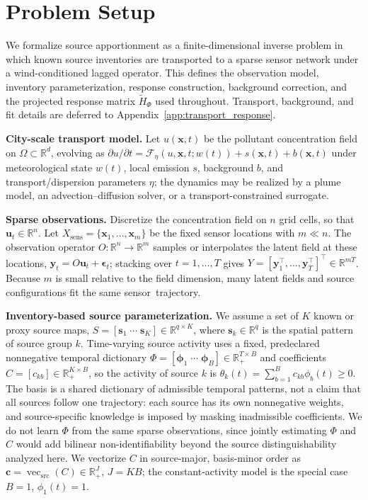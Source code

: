 \section{Problem Setup}
\label{sec:problem_setup}

We formalize source apportionment as a finite-dimensional inverse problem in which
known source inventories are transported to a sparse sensor network under a
wind-conditioned lagged operator.  This defines the observation model, inventory
parameterization, response construction, background correction, and the projected
response matrix \(\widetilde H_\Phi\) used throughout.  Transport, background, and fit
details are deferred to Appendix~\ref{app:transport_response}.

\noindent\textbf{City-scale transport model.}
Let \(u(\mathbf x,t)\) be the pollutant concentration field on
\(\Omega\subset \mathbb R^d\), evolving as \(\partial u/\partial t
= \mathcal F_\eta(u,\mathbf x,t;w(t)) + s(\mathbf x,t)+b(\mathbf x,t)\) under
meteorological state \(w(t)\), local emission \(s\), background \(b\), and
transport/dispersion parameters \(\eta\); the dynamics may be realized by a plume
model, an advection--diffusion solver, or a transport-constrained surrogate.

\noindent\textbf{Sparse observations.}
Discretize the concentration field on \(n\) grid cells, so that
\(\mathbf u_t\in \mathbb R^n\).  Let
\(X_{\mathrm{sens}}=\{\mathbf x_1,\ldots,\mathbf x_m\}\) be the fixed sensor
locations with \(m\ll n\).  The observation operator
\(O:\mathbb R^n\to \mathbb R^m\) samples or interpolates the latent field at
these locations, \(\mathbf y_t = O\mathbf u_t + \boldsymbol\epsilon_t\); stacking
over \(t=1,\ldots,T\) gives
\(Y = [\mathbf y_1^\top,\ldots,\mathbf y_T^\top]^\top \in \mathbb R^{mT}\).
Because \(m\) is small relative to the field dimension, many latent fields and
source configurations fit the same sensor~trajectory.

\noindent\textbf{Inventory-based source parameterization.}
We assume a set of \(K\) known or proxy source maps,
\(S = [\mathbf s_1\;\cdots\;\mathbf s_K]\in \mathbb R^{q\times K}\),
where \(\mathbf s_k\in\mathbb R^q\) is the spatial pattern of source group
\(k\).  Time-varying source activity uses a fixed, predeclared nonnegative
temporal dictionary
\(\Phi=[\boldsymbol\phi_1\;\cdots\;\boldsymbol\phi_B]\in\mathbb R_+^{T\times B}\)
and coefficients \(C=[c_{kb}]\in\mathbb R_+^{K\times B}\), so the activity of
source \(k\) is \(\theta_k(t)=\sum_{b=1}^{B}c_{kb}\phi_b(t)\ge0\).  The basis is a
shared dictionary of admissible temporal patterns, not a claim that all sources
follow one trajectory: each source has its own nonnegative weights, and
source-specific knowledge is imposed by masking inadmissible coefficients.  We do
not learn \(\Phi\) from the same sparse observations, since jointly estimating
\(\Phi\) and \(C\) would add bilinear non-identifiability beyond the source
distinguishability analyzed here.  We vectorize \(C\) in source-major, basis-minor order as
\(\mathbf c=\operatorname{vec}_{\mathrm{src}}(C)\in\mathbb R_+^J\), \(J=KB\); the
constant-activity model is the special case \(B=1\), \(\phi_1(t)=1\).

